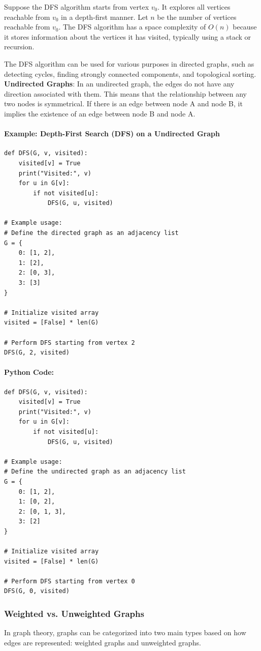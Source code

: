 \documentclass[12pt]{book} %
\begin{document}
Suppose the DFS algorithm starts from vertex $v_0$. It explores all vertices reachable from $v_0$ in a depth-first manner. Let $n$ be the number of vertices reachable from $v_0$. The DFS algorithm has a space complexity of $O(n)$ because it stores information about the vertices it has visited, typically using a stack or recursion.

The DFS algorithm can be used for various purposes in directed graphs, such as detecting cycles, finding strongly connected components, and topological sorting.
\FloatBarrier
\textbf{Undirected Graphs}:
\FloatBarrier
In an undirected graph, the edges do not have any direction associated with them. This means that the relationship between any two nodes is symmetrical. If there is an edge between node A and node B, it implies the existence of an edge between node B and node A.
\FloatBarrier
\paragraph{Example: Depth-First Search (DFS) on a Undirected Graph}
\FloatBarrier
\begin{verbatim}
def DFS(G, v, visited):
    visited[v] = True
    print("Visited:", v)
    for u in G[v]:
        if not visited[u]:
            DFS(G, u, visited)

# Example usage:
# Define the directed graph as an adjacency list
G = {
    0: [1, 2],
    1: [2],
    2: [0, 3],
    3: [3]
}

# Initialize visited array
visited = [False] * len(G)

# Perform DFS starting from vertex 2
DFS(G, 2, visited)
\end{verbatim}
\FloatBarrier
\paragraph{Python Code:}
\FloatBarrier
\begin{verbatim}
def DFS(G, v, visited):
    visited[v] = True
    print("Visited:", v)
    for u in G[v]:
        if not visited[u]:
            DFS(G, u, visited)

# Example usage:
# Define the undirected graph as an adjacency list
G = {
    0: [1, 2],
    1: [0, 2],
    2: [0, 1, 3],
    3: [2]
}

# Initialize visited array
visited = [False] * len(G)

# Perform DFS starting from vertex 0
DFS(G, 0, visited)
\end{verbatim}
\FloatBarrier
\subsubsection{Weighted vs. Unweighted Graphs}
In graph theory, graphs can be categorized into two main types based on how edges are represented: weighted graphs and unweighted graphs. 
\end{document}
